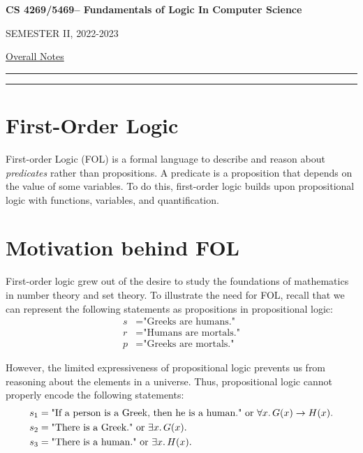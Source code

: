 \documentclass[11pt,usenames, dvipsnames]{article}
\newcommand{\masunitnumber}{CS 4269/5469}
\newcommand{\academicyear}{2022-2023}
\newcommand{\semester}{II}
\newcommand{\coursename}{Fundamentals of Logic In Computer Science}
\begin{document}
\setlength{\headsep}{5truemm}
\setlength{\headheight}{14.5truemm}
\setlength{\voffset}{-0.45truein}
\renewcommand{\headrulewidth}{0.0pt}

\begin{center}
{\Large \bf \masunitnumber -- \coursename}
\end{center}

\begin{center}
SEMESTER \semester, \academicyear
\end{center}

\begin{center}
\underline{Overall Notes}\\
\end{center}

\vspace{5truemm}
\hrule
\hrule

\section*{\large \centering First-Order Logic}
\noindent

First-order Logic (FOL) is a formal language to describe and reason about \emph{predicates} rather than propositions. A predicate is a proposition that depends on the value of some variables. To do this, first-order logic builds upon propositional logic with functions, variables, and quantification.

\section*{\large \centering Motivation behind FOL}
\noindent

First-order logic grew out of the desire to study the foundations of mathematics in number theory and set theory. To illustrate the need for FOL, recall that we can represent the following statements as propositions in propositional logic:
\begin{align*}
  s &= \text{"Greeks are humans."}
  \\
  r &= \text{"Humans are mortals."}
  \\
  p &= \text{"Greeks are mortals."}
\end{align*}

However, the limited expressiveness of propositional logic prevents us from reasoning about the elements in a universe. Thus, propositional logic cannot properly encode the following statements:
\begin{align*}
  s_1 &= \text{"If a person is a Greek, then he is a human." or } \forall x \ldotp G(x) \rightarrow H(x).
  \\
  s_2 &= \text{"There is a Greek." or } \exists x \ldotp G(x).
  \\
  s_3 &= \text{"There is a human." or } \exists x \ldotp H(x).
\end{align*}
\end{document}
